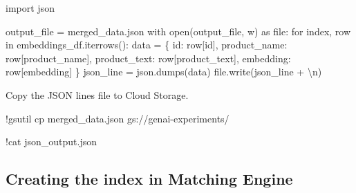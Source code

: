 \documentclass[
  letterpaper,
  DIV=11,
  numbers=noendperiod]{scrreprt}
\newenvironment{Shaded}{\begin{snugshade}}{\end{snugshade}}
\newcommand{\BuiltInTok}[1]{\textcolor[rgb]{0.00,0.23,0.31}{#1}}
\newcommand{\CharTok}[1]{\textcolor[rgb]{0.13,0.47,0.30}{#1}}
\newcommand{\ControlFlowTok}[1]{\textcolor[rgb]{0.00,0.23,0.31}{#1}}
\newcommand{\ImportTok}[1]{\textcolor[rgb]{0.00,0.46,0.62}{#1}}
\newcommand{\KeywordTok}[1]{\textcolor[rgb]{0.00,0.23,0.31}{#1}}
\newcommand{\NormalTok}[1]{\textcolor[rgb]{0.00,0.23,0.31}{#1}}
\newcommand{\OperatorTok}[1]{\textcolor[rgb]{0.37,0.37,0.37}{#1}}
\newcommand{\StringTok}[1]{\textcolor[rgb]{0.13,0.47,0.30}{#1}}
\begin{document}
\begin{Shaded}
\begin{Highlighting}[]
\ImportTok{import}\NormalTok{ json}

\NormalTok{output\_file }\OperatorTok{=} \StringTok{\textquotesingle{}merged\_data.json\textquotesingle{}}
\ControlFlowTok{with} \BuiltInTok{open}\NormalTok{(output\_file, }\StringTok{\textquotesingle{}w\textquotesingle{}}\NormalTok{) }\ImportTok{as} \BuiltInTok{file}\NormalTok{:}
    \ControlFlowTok{for}\NormalTok{ index, row }\KeywordTok{in}\NormalTok{ embeddings\_df.iterrows():}
\NormalTok{        data }\OperatorTok{=}\NormalTok{ \{}
            \StringTok{\textquotesingle{}id\textquotesingle{}}\NormalTok{: row[}\StringTok{\textquotesingle{}id\textquotesingle{}}\NormalTok{],}
            \StringTok{\textquotesingle{}product\_name\textquotesingle{}}\NormalTok{: row[}\StringTok{\textquotesingle{}product\_name\textquotesingle{}}\NormalTok{],}
            \StringTok{\textquotesingle{}product\_text\textquotesingle{}}\NormalTok{: row[}\StringTok{\textquotesingle{}product\_text\textquotesingle{}}\NormalTok{],}
            \StringTok{\textquotesingle{}embedding\textquotesingle{}}\NormalTok{: row[}\StringTok{\textquotesingle{}embedding\textquotesingle{}}\NormalTok{]}
\NormalTok{        \}}
\NormalTok{        json\_line }\OperatorTok{=}\NormalTok{ json.dumps(data)}
        \BuiltInTok{file}\NormalTok{.write(json\_line }\OperatorTok{+} \StringTok{\textquotesingle{}}\CharTok{\textbackslash{}n}\StringTok{\textquotesingle{}}\NormalTok{)}
\end{Highlighting}
\end{Shaded}

Copy the JSON lines file to Cloud Storage.

\begin{Shaded}
\begin{Highlighting}[]
\OperatorTok{!}\NormalTok{gsutil cp merged\_data.json gs:}\OperatorTok{//}\NormalTok{genai}\OperatorTok{{-}}\NormalTok{experiments}\OperatorTok{/}
\end{Highlighting}
\end{Shaded}

\begin{Shaded}
\begin{Highlighting}[]
\OperatorTok{!}\NormalTok{cat json\_output.json}
\end{Highlighting}
\end{Shaded}

\hypertarget{creating-the-index-in-matching-engine}{%
\subsection{Creating the index in Matching
Engine}\label{creating-the-index-in-matching-engine}}
\end{document}
